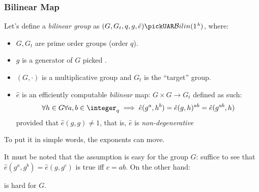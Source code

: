 

\subsubsection{Bilinear Map}

\begin{definition}
    
    Let's define a \emph{bilinear group} as $(G, G_t, q, g, \hat{e}) \pickUAR \mathcal{B}ilin(1^\lambda)$, where:
    \begin{itemize}
        \item $G, G_t$ are prime order groups (order $q$).
        \item $g$ is a generator of $G$ picked \uar.
        \item $(G, \cdot)$ is a multiplicative group and $G_t$ is the ``target'' group.
        \item $\hat{e}$ is an efficiently computable \emph{bilinear} map: $G \times G \rightarrow G_t$ defined as such:
        \[
            \forall h \in G \forall a, b \in \integer_q \implies \hat{e}(g^a, h^b) = \hat{e}(g, h)^{ab} = \hat{e}(g^{ab}, h)
        \]
        provided that $\hat{e}(g, g) \neq 1$, that is, $\hat{e}$ is \emph{non-degenerative}
    \end{itemize}

    To put it in simple words, the exponents can move.
\end{definition}


It must be noted that the \ddh{} assumption is easy for the group $G$: suffice to see that $\hat{e}(g^a, g^b) = \hat{e}(g, g^c)$ is true iff $c = ab$. On the other hand:

\begin{proposition}
    \cdh{} is hard for $G$.
\end{proposition}

